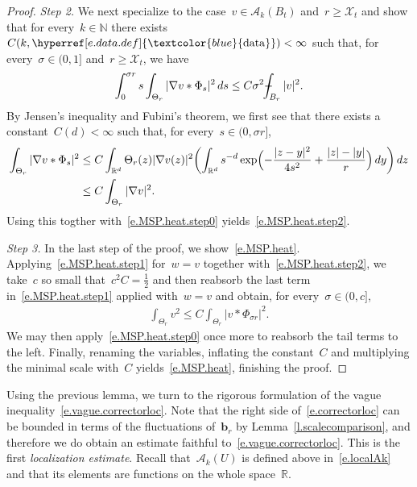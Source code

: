 \documentclass[11pt,twoside]{article} %
\numberwithin{equation}{section}
\theoremstyle{definition}
\newcommand{\dataref}{\hyperref[e.data.def]{\textcolor{blue}{\ensuremath{\mathrm{data}}}}}
\newcommand*{\N}{\ensuremath{\mathbb{N}}}
\newcommand*{\R}{\ensuremath{\mathbb{R}}}
\renewcommand{\b}{\ensuremath{\mathbf{b}}}
\newcommand{\X}{\mathcal{X}}
\def\Xint#1{\mathchoice
{\XXint\displaystyle\textstyle{#1}}%
{\XXint\textstyle\scriptstyle{#1}}%
{\XXint\scriptstyle\scriptscriptstyle{#1}}%
{\XXint\scriptscriptstyle\scriptscriptstyle{#1}}%
\!\int}
\def\XXint#1#2#3{{\setbox0=\hbox{$#1{#2#3}{\int}$}
\vcenter{\hbox{$#2#3$}}\kern-.5\wd0}}
\def\fint{\Xint-}
\newcommand{\A}{\mathcal{A}}
\begin{document}
\begin{proof}
\emph{Step 2.}
We next specialize to the case~$v \in \A_k(B_t)$ and~$r \geq  \X_t$ and show that for every~$k \in \N$ there exists~$C(k,\dataref)<\infty$ such that, for every~$\sigma \in (0,1]$ and~$r \geq \X_t$, we have
\begin{align} \label{e.MSP.heat.step2}
 \int_{0}^{\sigma r} s \int_{\Theta_r} | \nabla v \ast \Phi_{s}|^2 \, ds
\leq 
C \sigma^2 \fint_{B_r} |v|^2 
.
\end{align}
By Jensen's inequality and Fubini's theorem, we first see that there exists a constant~$C(d)<\infty$ such that, for every~$s \in (0,\sigma r]$, 
\begin{align*} %
\int_{\Theta_r} | \nabla v \ast \Phi_{s}|^2 
& 
\leq 
C  \int_{\R^d} \Theta_r(z) | \nabla v(z)|^2 \biggl( \int_{\R^d} s^{-d} \exp\Bigl( - \frac{|z-y|^2}{4s^2} + \frac{|z|-|y|}{r} \Bigr) \, dy \biggr) \, dz 
\\ \notag 
&
\leq
C \int_{\Theta_r} | \nabla v|^2 
.
\end{align*}
Using this togther with~\eqref{e.MSP.heat.step0} yields~\eqref{e.MSP.heat.step2}.

 \smallskip
 
\emph{Step 3.}
In the last step of the proof, we show~\eqref{e.MSP.heat}. Applying~\eqref{e.MSP.heat.step1} for~$w = v$ together with~\eqref{e.MSP.heat.step2}, we take~$c$ so small that~$c^2 C =\frac12$ and then reabsorb 
the last term in~\eqref{e.MSP.heat.step1} applied with~$w = v$ and obtain, for every~$\sigma \in (0,c]$, 
\begin{align*}  
\int_{\Theta_r} v^2  \leq C \int_{\Theta_r} | v \ast \Phi_{\sigma r}|^2 
.
\end{align*}
We may then apply~\eqref{e.MSP.heat.step0} once more to reabsorb the tail terms to the left. Finally, renaming the variables, inflating the constant~$C$ and multiplying the minimal scale with~$C$ yields~\eqref{e.MSP.heat}, finishing the proof.
\end{proof}


Using the previous lemma, we turn to the rigorous formulation of the vague inequality~\eqref{e.vague.correctorloc}. 
Note that the right side of~\eqref{e.correctorloc} can be bounded in terms of the fluctuations of~$\b_r$ by Lemma~\ref{l.scalecomparison}, and therefore we do obtain an estimate faithful to~\eqref{e.vague.correctorloc}.  This is the first \emph{localization estimate}. Recall that~$\A_k(U)$ is defined above in~\eqref{e.localAk} and that its elements are functions on the whole space~$\R$. 
\end{document}
